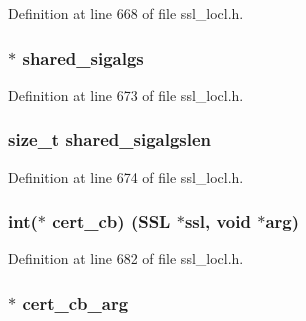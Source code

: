 Definition at line 668 of file ssl\+\_\+locl.\+h.

\subsubsection[{\texorpdfstring{shared\+\_\+sigalgs}{shared_sigalgs}}]{$\ast$ shared\+\_\+sigalgs}\hypertarget{structcert__st_a1c623525317c82972b5a5211a356214a}{}\label{structcert__st_a1c623525317c82972b5a5211a356214a}


Definition at line 673 of file ssl\+\_\+locl.\+h.

\subsubsection[{\texorpdfstring{shared\+\_\+sigalgslen}{shared_sigalgslen}}]{\setlength{\rightskip}{0pt plus 5cm}size\+\_\+t shared\+\_\+sigalgslen}\hypertarget{structcert__st_a59e2ecc2312469cab69d97afb231edad}{}\label{structcert__st_a59e2ecc2312469cab69d97afb231edad}


Definition at line 674 of file ssl\+\_\+locl.\+h.

\subsubsection[{\texorpdfstring{cert\+\_\+cb}{cert_cb}}]{\setlength{\rightskip}{0pt plus 5cm}int($\ast$ cert\+\_\+cb) ({\bf S\+SL} $\ast$ssl, {\bf void} $\ast$arg)}\hypertarget{structcert__st_abd53d838428f924fed3b9f1fb54a7ff1}{}\label{structcert__st_abd53d838428f924fed3b9f1fb54a7ff1}


Definition at line 682 of file ssl\+\_\+locl.\+h.

\subsubsection[{\texorpdfstring{cert\+\_\+cb\+\_\+arg}{cert_cb_arg}}]{$\ast$ cert\+\_\+cb\+\_\+arg}\hypertarget{structcert__st_aa3a74fb1bb790343f4396b215f1bd641}{}\label{structcert__st_aa3a74fb1bb790343f4396b215f1bd641}


